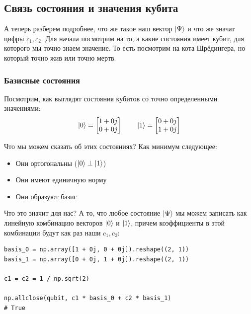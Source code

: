 \documentclass[11pt]{article}
\begin{document}
\subsection{Связь состояния и значения кубита}
\label{sec:org55322c4}
А теперь разберем подробнее, что же такое наш вектор \(\ket{\Psi}\) и что же значат цифры \(c_1, c_2\). Для начала посмотрим на то, а какие состояния имеет кубит, для которого мы точно знаем значение. То есть посмотрим на кота Шрёдингера, но который точно жив или точно мертв.

\subsubsection{Базисные состояния}
\label{sec:org443ea8c}
Посмотрим, как выглядят состояния кубитов со точно определенными значениями:
\begin{align*}
\ket{0} = \begin{bmatrix}1 + 0j \\ 0 + 0j\end{bmatrix} \text{\qquad} \ket{1} = \begin{bmatrix}0 + 0j \\ 1 + 0j\end{bmatrix}
\end{align*}

Что мы можем сказать об этих состояниях? Как минимум следующее:
\begin{itemize}
\item Они ортогональны (\(\ket{0} \perp \ket{1}\))
\item Они имеют единичную норму
\item Они образуют базис
\end{itemize}

Что это значит для нас? А то, что любое состояние \(\ket{\Psi}\) мы можем записать как линейную комбинацию векторов \(\ket{0}\) и \(\ket{1}\), причем коэффициенты в этой комбинации будут как раз наши \(c_1, c_2\):

\begin{verbatim}
basis_0 = np.array([1 + 0j, 0 + 0j]).reshape((2, 1))
basis_1 = np.array([0 + 0j, 1 + 0j]).reshape((2, 1))

c1 = c2 = 1 / np.sqrt(2)

np.allclose(qubit, c1 * basis_0 + c2 * basis_1)
# True
\end{verbatim}
\end{document}
